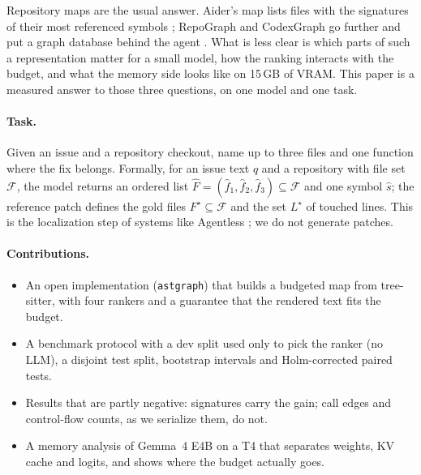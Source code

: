\documentclass[10pt]{article}
\begin{document}
Repository maps are the usual answer. Aider's map lists files with the signatures of their most referenced symbols \cite{aider}; RepoGraph and CodexGraph go further and put a graph database behind the agent \cite{repograph,codexgraph}. What is less clear is which parts of such a representation matter for a small model, how the ranking interacts with the budget, and what the memory side looks like on 15\,GB of VRAM. This paper is a measured answer to those three questions, on one model and one task.

\paragraph{Task.} Given an issue and a repository checkout, name up to three files and one function where the fix belongs. Formally, for an issue text $q$ and a repository with file set $\mathcal F$, the model returns an ordered list $\hat F=(\hat f_1,\hat f_2,\hat f_3)\subseteq\mathcal F$ and one symbol $\hat s$; the reference patch defines the gold files $F^\star\subseteq\mathcal F$ and the set $L^\star$ of touched lines. This is the localization step of systems like Agentless \cite{agentless}; we do not generate patches.

\paragraph{Contributions.}
\begin{itemize}\itemsep0pt
\item An open implementation (\texttt{astgraph}) that builds a budgeted map from tree-sitter, with four rankers and a guarantee that the rendered text fits the budget.
\item A benchmark protocol with a dev split used only to pick the ranker (no LLM), a disjoint test split, bootstrap intervals and Holm-corrected paired tests.
\item Results that are partly negative: signatures carry the gain; call edges and control-flow counts, as we serialize them, do not.
\item A memory analysis of Gemma~4 E4B on a T4 that separates weights, KV cache and logits, and shows where the budget actually goes.
\end{itemize}
\end{document}
